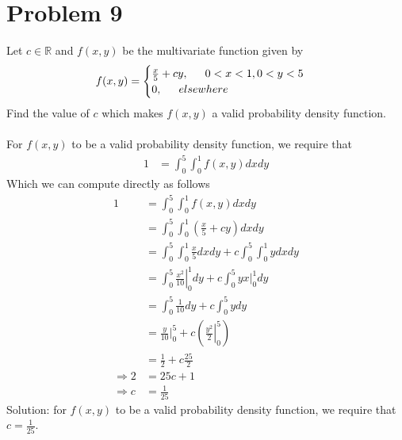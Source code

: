 \documentclass[11pt, letterpaper]{article}
\begin{document}
\section*{Problem 9}
Let $c\in\mathbb{R}$ and $f(x,y)$ be the multivariate function given by
\begin{align*}
    f(x,y)=
    \begin{cases}
        \frac{x}{5}+cy,\indent 0<x<1,\space 0<y<5\\
        0,\indent elsewhere
    \end{cases}
\end{align*}
Find the value of $c$ which makes $f(x,y)$ a valid probability density function.\\\\
For $f(x,y)$ to be a valid probability density function, we require that
\begin{align*}
    1&=\int_0^5\int_0^1f(x,y)dxdy
\end{align*}
Which we can compute directly as follows
\begin{align*}
    1&=\int_0^5\int_0^1f(x,y)dxdy\\
    &=\int_0^5\int_0^1(\frac{x}{5}+cy)dxdy\\
    &=\int_0^5\int_0^1\frac{x}{5}dxdy+c\int_0^5\int_0^1ydxdy\\
    &=\int_0^5\left.\frac{x^2}{10}\right|_{0}^1dy+c\int_0^5yx\bigg|_0^1dy\\
    &=\int_0^5\frac{1}{10}dy+c\int_0^5ydy\\
    &=\frac{y}{10}\bigg|_0^5+c\left(\left.\frac{y^2}{2}\right|_0^5\right)\\
    &=\frac{1}{2}+c\frac{25}{2}\\
    \Rightarrow 2&=25c+1\\
    \Rightarrow c&=\frac{1}{25}
\end{align*}
Solution: for $f(x,y)$ to be a valid probability density function, we require that $c=\frac{1}{25}$.
\end{document}

